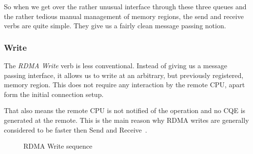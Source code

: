 So when we get over the rather unusual interface through these three queues and the rather tedious manual management of 
memory regions, the send and receive verbs are quite simple. They give us a fairly clean message passing notion.


\subsubsection{Write} \label{sec:bg:write}

The \emph{RDMA Write} verb is less conventional. Instead of giving us a message passing interface, it allows us to write at 
an arbitrary, but previously registered, memory region. This does not require any interaction by the remote CPU, apart form
the initial connection setup. 

That also means the remote CPU is not notified of the operation and no CQE is generated at the 
remote. This is the main reason why RDMA writes are generally considered to be faster then Send and Receive~\cite{anuj-guide}.


\begin{figure}[!ht]
\begin{center}
\end{center}
\caption{RDMA Write sequence}
\label{fig:seq-wrt}
\end{figure}

